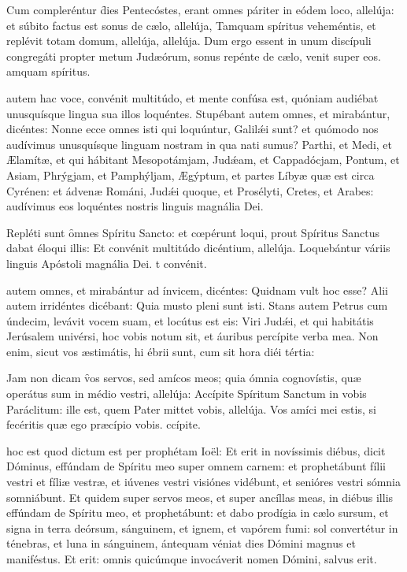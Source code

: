 \documentclass[fontsize=9pt,paper=A6,twoside,BCOR=1mm,DIV=22,headinclude]{scrarticle}
\begin{document}
\begin{multicols}{2}
\R Cum compleréntur \f dies Pentecóstes, erant omnes páriter in eódem loco, allelúja: et súbito factus est sonus de cælo, allelúja,
\red{*} Tamquam spíritus veheméntis, et replévit totam domum, allelúja, allelúja.
\V Dum ergo essent in unum discípuli congregáti propter metum Judæórum, sonus repénte de cælo, venit super eos.
amquam spíritus.

 autem hac voce, convénit multitúdo, et mente confúsa est, quóniam audiébat unusquísque lingua sua illos loquéntes. Stupébant autem omnes, et mirabántur, dicéntes: Nonne ecce omnes isti qui loquúntur, Galilǽi sunt? et quómodo nos audívimus unusquísque linguam nostram in qua nati sumus? Parthi, et Medi, et Ælamítæ, et qui hábitant Mesopotámjam, Judǽam, et Cappadócjam, Pontum, et Asiam, Phrýgjam, et Pamphýljam, Ægýptum, et partes Líbyæ quæ est circa Cyrénen: et ádvenæ Románi, Judǽi quoque, et Prosélyti, Cretes, et Arabes: audívimus eos loquéntes nostris linguis magnália Dei.

\R Repléti sunt \f omnes Spíritu Sancto: et cœpérunt loqui, prout Spíritus Sanctus dabat éloqui illis:
\red{*} Et convénit multitúdo dicéntium, allelúja.
\V Loquebántur váriis linguis Apóstoli magnália Dei.
t convénit.

 autem omnes, et mirabántur ad ínvicem, dicéntes: Quidnam vult hoc esse? Alii autem irridéntes dicébant: Quia musto pleni sunt isti. Stans autem Petrus cum úndecim, levávit vocem suam, et locútus est eis: Viri Judǽi, et qui habitátis Jerúsalem univérsi, hoc vobis notum sit, et áuribus percípite verba mea. Non enim, sicut vos æstimátis, hi ébrii sunt, cum sit hora diéi tértia:

\R Jam non dicam \f vos servos, sed amícos meos; quia ómnia cognovístis, quæ operátus sum in médio vestri, allelúja:
\red{*} Accípite Spíritum Sanctum in vobis Paráclitum: ille est, quem Pater mittet vobis, allelúja.
\V Vos amíci mei estis, si fecéritis quæ ego præcípio vobis.
ccípite.

 hoc est quod dictum est per prophétam Ioël: Et erit in novíssimis diébus, dicit Dóminus, effúndam de Spíritu meo super omnem carnem: et prophetábunt fílii vestri et fíliæ vestræ, et iúvenes vestri visiónes vidébunt, et senióres vestri sómnia somniábunt. Et quidem super servos meos, et super ancíllas meas, in diébus illis effúndam de Spíritu meo, et prophetábunt: et dabo prodígia in cælo sursum, et signa in terra deórsum, sánguinem, et ignem, et vapórem fumi: sol convertétur in ténebras, et luna in sánguinem, ántequam véniat dies Dómini magnus et maniféstus. Et erit: omnis quicúmque invocáverit nomen Dómini, salvus erit.


\end{multicols}
\end{document}

